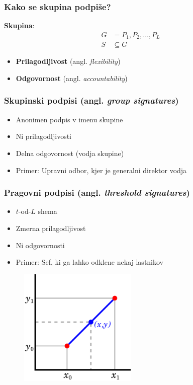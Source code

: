 \documentclass{beamer}    %
\begin{document}
\begin{frame}
    \frametitle{Kako se skupina podpiše?}
    \textbf{Skupina}: 
    \begin{align*}
        G &= P_1, P_2, \dots, P_L \\
        S &\subseteq G
    \end{align*}
    \vspace{1cm}
    \begin{itemize}
        \item \textbf{Prilagodljivost} (angl. \textit{flexibility})
        \item \textbf{Odgovornost} (angl. \textit{accountability})
    \end{itemize}
\end{frame}

\begin{frame}
    \frametitle{Skupinski podpisi (angl. \textit{group signatures})}
    \begin{itemize}
        \item Anonimen podpis v imenu skupine
        \item Ni prilagodljivosti
        \item Delna odgovornost (vodja skupine)
        \item Primer: Upravni odbor, kjer je generalni direktor vodja
    \end{itemize}
\end{frame}

\begin{frame}
    \frametitle{Pragovni podpisi (angl. \textit{threshold signatures})}
    \begin{multicols*}{2}
        \begin{itemize}
            \item $t$-od-$L$ shema
            \item Zmerna prilagodljivost
            \item Ni odgovornosti
            \item Primer: Sef, ki ga lahko odklene nekaj lastnikov
        \end{itemize}
    \begin{figure}
        \includegraphics[width=0.5\textwidth]{images/interpolation.png}
    \end{figure}
    \end{multicols*}
\end{frame}
\end{document}
